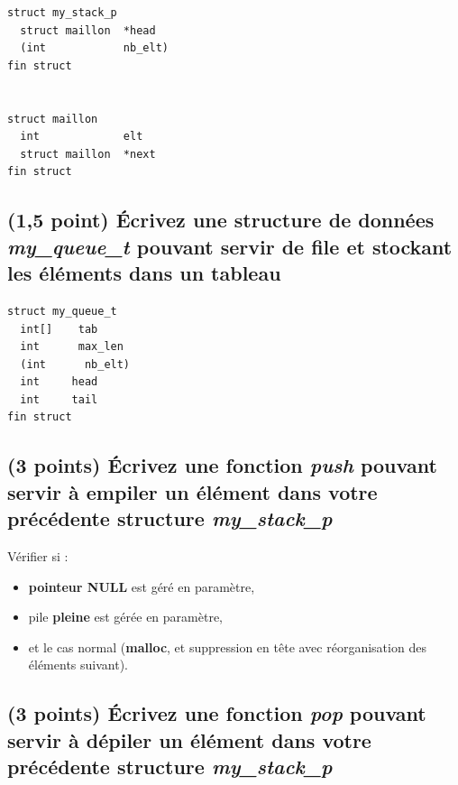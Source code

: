 \documentclass[11pt,a4paper]{article}
\begin{document}
\bigskip

\begin{center}
\begin{lstlisting}[style=algorithmique]
struct my_stack_p
  struct maillon  *head
  (int            nb_elt)
fin struct


struct maillon
  int             elt
  struct maillon  *next
fin struct
\end{lstlisting}
\end{center}

\bigskip


\subsection{(1,5 point) \'Ecrivez une structure de données \og \textit{my\_queue\_t} \fg{} pouvant servir de file et stockant les éléments dans un tableau }

\bigskip

\begin{center}
\begin{lstlisting}[style=algorithmique]
struct my_queue_t
  int[]    tab
  int      max_len
  (int      nb_elt)
  int     head
  int     tail  
fin struct
\end{lstlisting}
\end{center}




\newpage

\subsection{(3 points) \'Ecrivez une fonction \og \textit{push} \fg{} pouvant servir à empiler un élément dans votre précédente structure \og \textit{my\_stack\_p} \fg{} }

\bigskip

\begin{center}
Vérifier si :
\begin{itemize}
\item \textbf{pointeur NULL} est géré en paramètre,
\item pile \textbf{pleine} est gérée en paramètre,
\item et le cas normal (\textbf{malloc}, et suppression en tête avec réorganisation des éléments suivant).
\end{itemize}
\end{center}

\bigskip

\subsection{(3 points) \'Ecrivez une fonction \og \textit{pop} \fg{} pouvant servir à dépiler un élément dans votre précédente structure \og \textit{my\_stack\_p} \fg{} }
\end{document}
